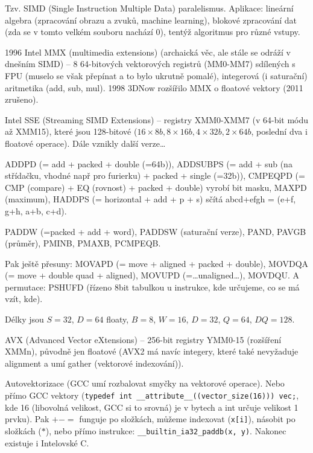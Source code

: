 \documentclass[12pt]{article}                   %
\begin{document}
        \begin{definice}
            Tzv. SIMD (Single Instruction Multiple Data) paralelismus. Aplikace: lineární algebra (zpracování obrazu a zvuků, machine learning), blokové zpracování dat (zda se v tomto velkém souboru nachází 0), tentýž algoritmus pro různé vstupy.

            1996 Intel MMX (multimedia extensions) (archaická věc, ale stále se odráží v dnešním SIMD) -- 8 64-bitových vektorových registrů (MM0-MM7) sdílených s FPU (muselo se však přepínat a to bylo ukrutně pomalé), integerová (i saturační) aritmetika (add, sub, mul). 1998 3DNow rozšířilo MMX o floatové vektory (2011 zrušeno).

            Intel SSE (Streaming SIMD Extensions) -- registry XMM0-XMM7 (v 64-bit módu až XMM15), které jsou 128-bitové ($16\times 8b, 8 \times 16b, 4 \times 32b, 2 \times 64b$, poslední dva i floatové operace). Dále vznikly další verze…

            ADDPD (= add + packed + double (=64b)), ADDSUBPS (= add + sub (na střídačku, vhodné např pro furierku) + packed + single (=32b)), CMPEQPD (= CMP (compare) + EQ (rovnost) + packed + double) vyrobí bit masku, MAXPD (maximum), HADDPS (= horizontal + add + p + s) sčítá abcd+efgh = (e+f, g+h, a+b, c+d).

            PADDW (=packed + add + word), PADDSW (saturační verze), PAND, PAVGB (průměr), PMINB, PMAXB, PCMPEQB.

            Pak ještě přesuny: MOVAPD (= move + aligned + packed + double), MOVDQA (= move + double quad + aligned), MOVUPD (=…unaligned…), MOVDQU. A permutace: PSHUFD (řízeno 8bit tabulkou u instrukce, kde určujeme, co se má vzít, kde).

            Délky jsou $S=32$, $D=64$ floaty, $B=8$, $W=16$, $D=32$, $Q=64$, $DQ=128$.

            AVX (Advanced Vector eXtensions) -- 256-bit registry YMM0-15 (rozšíření XMMn), původně jen floatové (AVX2 má navíc integery, které také nevyžaduje alignment a umí gather (vektorové indexování)).
        \end{definice}

        \begin{definice}
            Autovektorizace (GCC umí rozbalovat smyčky na vektorové operace). Nebo přímo GCC vektory (\verb|typedef int __attribute__((vector_size(16))) vec;|, kde 16 (libovolná velikost, GCC si to srovná) je v bytech a int určuje velikost 1 prvku). Pak $+-=$ funguje po složkách, můžeme indexovat (\verb|x[i]|), násobit po složkách ($*$), nebo přímo instrukce: \verb|__builtin_ia32_paddb(x, y)|. Nakonec existuje i Intelovské C.
        \end{definice}
\end{document}
